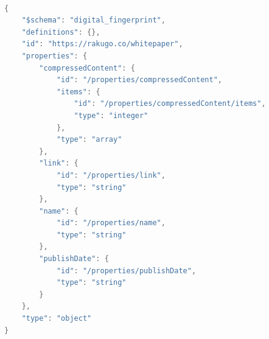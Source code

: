 \documentclass{article}
\begin{document}
\newpage

\renewcommand{\lstlistingname}{Appendix}
\begin{lstlisting}[caption={Digital Fingerprint},captionpos=b, language=java,numbers=none]

{
    "$schema": "digital_fingerprint",
    "definitions": {},
    "id": "https://rakugo.co/whitepaper",
    "properties": {
        "compressedContent": {
            "id": "/properties/compressedContent",
            "items": {
                "id": "/properties/compressedContent/items",
                "type": "integer"
            },
            "type": "array"
        },
        "link": {
            "id": "/properties/link",
            "type": "string"
        },
        "name": {
            "id": "/properties/name",
            "type": "string"
        },
        "publishDate": {
            "id": "/properties/publishDate",
            "type": "string"
        }
    },
    "type": "object"
}

\end{lstlisting}


\end{document}
